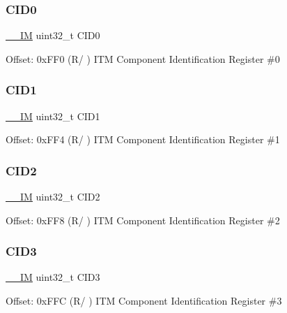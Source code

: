 \subsubsection{\texorpdfstring{C\+I\+D0}{CID0}}
{\footnotesize\ttfamily \mbox{\hyperlink{core__cm4_8h_a4cc1649793116d7c2d8afce7a4ffce43}{\+\_\+\+\_\+\+IM}} uint32\+\_\+t C\+I\+D0}

Offset\+: 0x\+F\+F0 (R/ ) I\+TM Component Identification Register \#0 \mbox{\label{struct_i_t_m___type_a4e60a608afd6433ecd943d95e417b80b}} 
\subsubsection{\texorpdfstring{C\+I\+D1}{CID1}}
{\footnotesize\ttfamily \mbox{\hyperlink{core__cm4_8h_a4cc1649793116d7c2d8afce7a4ffce43}{\+\_\+\+\_\+\+IM}} uint32\+\_\+t C\+I\+D1}

Offset\+: 0x\+F\+F4 (R/ ) I\+TM Component Identification Register \#1 \mbox{\label{struct_i_t_m___type_ad98950702e55d1851e91b22de07b11aa}} 
\subsubsection{\texorpdfstring{C\+I\+D2}{CID2}}
{\footnotesize\ttfamily \mbox{\hyperlink{core__cm4_8h_a4cc1649793116d7c2d8afce7a4ffce43}{\+\_\+\+\_\+\+IM}} uint32\+\_\+t C\+I\+D2}

Offset\+: 0x\+F\+F8 (R/ ) I\+TM Component Identification Register \#2 \mbox{\label{struct_i_t_m___type_ab9af64f413bf6f67e2a8044481292f67}} 
\subsubsection{\texorpdfstring{C\+I\+D3}{CID3}}
{\footnotesize\ttfamily \mbox{\hyperlink{core__cm4_8h_a4cc1649793116d7c2d8afce7a4ffce43}{\+\_\+\+\_\+\+IM}} uint32\+\_\+t C\+I\+D3}

Offset\+: 0x\+F\+FC (R/ ) I\+TM Component Identification Register \#3 \mbox{\label{struct_i_t_m___type_ae370aa5dc47fe03310e1d847333030e7}} 

